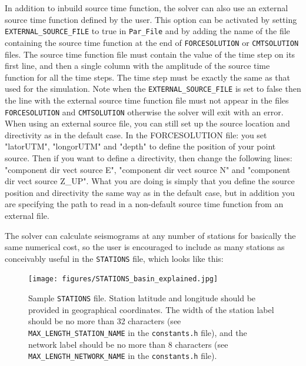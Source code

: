 \vspace{1cm}

In addition to inbuild source time function, the solver can also use an external source time function defined by the user. This option can be
activated by setting   \texttt{EXTERNAL\_SOURCE\_FILE} to true in \texttt{Par\_File} and by adding the name of the file
containing the source time function at the end of \texttt{FORCESOLUTION} or \texttt{CMTSOLUTION} files.
The source time function file must contain the value of the time step on its first line, and then a single column with the amplitude of the source time function for all the time steps.
The time step must be exactly the same as that used for the simulation.
Note  when the  \texttt{EXTERNAL\_SOURCE\_FILE} is set to false then the line with the external source time function file must not appear in
the files  \texttt{FORCESOLUTION} and \texttt{CMTSOLUTION} otherwise the solver will exit with an error.
When using an external source file, you can still set up the source location and directivity as in the default case.
In the FORCESOLUTION file: you set "latorUTM", "longorUTM" and "depth" to define the position of your point source. Then if you want to define a directivity, then change the following lines: "component dir vect source E", "component dir vect source N" and "component dir vect source Z\_UP". What you are doing is simply that you define the source position and directivity the same way as in the default case, but in addition you are specifying the path to read in a non-default source time function from an external file.

\vspace{1cm}

The solver can calculate seismograms at any number of stations for
basically the same numerical cost, so the user is encouraged to include
as many stations as conceivably useful in the \texttt{STATIONS} file,
which looks like this:
%
\begin{figure}[H]
\begin{centering}
\texttt{[image: figures/STATIONS\_basin\_explained.jpg]}
\par
\end{centering}
\caption{Sample \texttt{STATIONS} file. Station latitude and longitude should
be provided in geographical coordinates. The width of the station
label should be no more than 32 characters (see \texttt{MAX\_LENGTH\_STATION\_NAME}
in the \texttt{constants.h} file), and the network label should be
no more than 8 characters (see \texttt{MAX\_LENGTH\_NETWORK\_NAME}
in the \texttt{constants.h} file).}
\label{fig:Sample-STATIONS-file.}
\end{figure}


